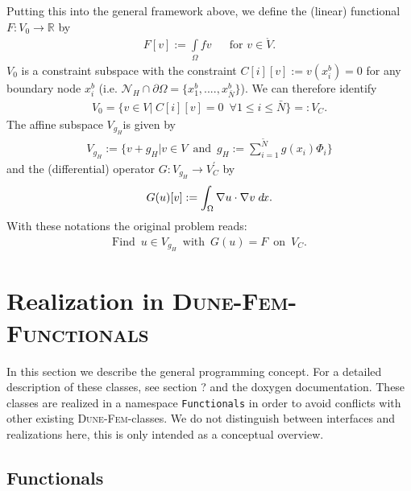 \documentclass[a4paper,11pt]{article}
\numberwithin{equation}{section}
\newcommand{\Code}[1]{\texttt{#1}}
\newcommand{\dunefem}{\textsc{Dune-Fem}\xspace}
\newcommand{\dunefemfunctionals}{\textsc{Dune-Fem-Functionals}\xspace}
\newcommand{\hnS}{\hspace{-1.25pt}}
\newcommand{\dx}{\;d\hnS x}
\newcommand{\R}{\mathbb{R}}
\begin{document}
      Putting this into the general framework above, we define the (linear) functional
      ${F: V_0 \rightarrow \R}$ by
      \begin{align*}
        F[v] := \int\limits_{\Omega} f v &&\text{for } v \in \mathring{V}.
      \end{align*}
      $V_0$ is a constraint subspace with the constraint $C[i][v] := v(x_i^b) = 0$ for any boundary node
      $x_i^b$ (i.e. $\mathcal{N}_H \cap \partial \Omega = \{ x_1^b, ...., x_{\bar{N}}^b\}$). We can therefore identify
      \begin{align*}
        V_0 = \{ v \in V| \hspace{3pt} C[i][v] = 0 \enspace \forall 1\le i\le \bar{N} \} =: V_C.
      \end{align*}
      The affine subspace $V_{g_H}$is given by
      \begin{align*}
        V_{g_H} :=
          \Big\{
            v + g_H
          \Big|
            v \in V \enspace \mbox{and} \enspace g_H := \sum_{i=1}^{\tilde{N}} g(x_i) \Phi_i
          \Big\}
      \end{align*}
      and the (differential) operator $G : V_{g_H} \rightarrow V_C^{\prime}$ by
      \begin{align*}
      G(u)[v] := \int_{\Omega} \nabla u \cdot \nabla v \dx.
      \end{align*}
      With these notations the original problem reads:
      \begin{align*}
      \text{Find} \enspace u \in V_{g_H} \enspace \mbox{with} \enspace G(u) = F \enspace \mbox{on} \enspace V_C.
      \end{align*}

  \section{Realization in \dunefemfunctionals}
    \label{realization_in_dune_fem_dunctionals}

    In this section we describe the general programming concept. For a detailed description of these classes, see
    section ? and the doxygen documentation. These classes are realized in a namespace \Code{Functionals} in order to
    avoid conflicts with other existing \dunefem-classes. We do not distinguish between interfaces and realizations
    here, this is only intended as a conceptual overview.

    \subsection{Functionals}
\end{document}
